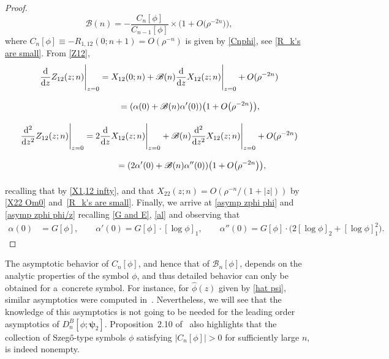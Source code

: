 \documentclass[pdftex]{sigma}
\numberwithin{equation}{section}
\newcommand{\al}{\alpha}
\newcommand{\dd}{{\rm d}}
\begin{document}
\begin{proof}
			\begin{equation}\label{BBB}
				\mathscr{B}(n) = - \frac{C_n[\phi]}{C_{n-1}[\phi]} \times \big(1 + O\big(\rho^{-2n}\big)\big),
			\end{equation}
			where $	C_n[\phi] \equiv -R_{1,12}(0;n+1) = O(\rho^{-n})$ is given by \eqref{Cnphi},
			see \eqref{R_k's are small}. From \eqref{Z12},
			\begin{gather*}
				\frac{\dd}{\dd z}Z_{12}(z;n) \Bigg|_{z=0} = X_{12}(0;n) + \mathscr{B}(n) 				\frac{\dd}{\dd z}X_{12}(z;n) \Bigg|_{z=0} + O(\rho^{-2n}) \\
\phantom{\frac{\dd}{\dd z}Z_{12}(z;n) \Bigg|_{z=0}}{} = ( \al(0) + \mathscr{B}(n) \al'(0) ) \big(1+ O\big(\rho^{-2n}\big)\big), \\
				\frac{\dd^2}{\dd z^2}Z_{12}(z;n) \Bigg|_{z=0} =2\frac{\dd}{\dd z}X_{12}(z;n) \Bigg|_{z=0} + \mathscr{B}(n) 				\frac{\dd^2}{\dd z^2}X_{12}(z;n) \Bigg|_{z=0} + O(\rho^{-2n}) \\
 \phantom{\frac{\dd^2}{\dd z^2}Z_{12}(z;n) \Bigg|_{z=0}}{}= ( 2\al'(0) + \mathscr{B}(n) \al''(0) ) \big(1+ O\big(\rho^{-2n}\big)\big),
			\end{gather*}
			recalling that  by \eqref{X1,12 infty}, and that $X_{22}(z;n) = O(\rho^{-n}/(1+|z|))$ by \eqref{X22 Om0} and~\eqref{R_k's are small}. Finally, we arrive at \eqref{asymp zphi phi} and \eqref{asymp zphi phi/z} recalling \eqref{G and E}, \eqref{al} and observing that
			\begin{align*}
				\al(0) & = G[\phi], \qquad
				\al'(0) = G[\phi] \cdot [\log \phi]_1, \qquad
				\al''(0) = G[\phi] \cdot \big( 2 [\log \phi]_2 + [\log \phi]^2_1 \big).	\tag*{\qed}			
			\end{align*}\renewcommand{\qed}{}
		\end{proof}

\begin{Remark}
The asymptotic behavior of $C_n[\phi]$, and hence that of $\mathscr{B}_n[\phi]$, depends on the analytic properties of the symbol $\phi$, and thus detailed behavior can only be obtained for a~concrete symbol. For instance, for $\widehat{\phi}(z)$ given by \eqref{hat psi}, similar asymptotics were computed in~\cite[Proposition~2.10]{BEGIL}. Nevertheless, we will see that the knowledge of this asymptotics is not going to be needed for the leading order asymptotics of $D^B_n[\phi;\boldsymbol{\psi}_2]$. Proposition~2.10 of~\cite{BEGIL} also highlights that the collection of Szeg\H{o}-type symbols $\phi$ satisfying $|C_n[\phi]|>0$ for sufficiently large $n$, is indeed nonempty.
\end{Remark}
		
\end{document}

